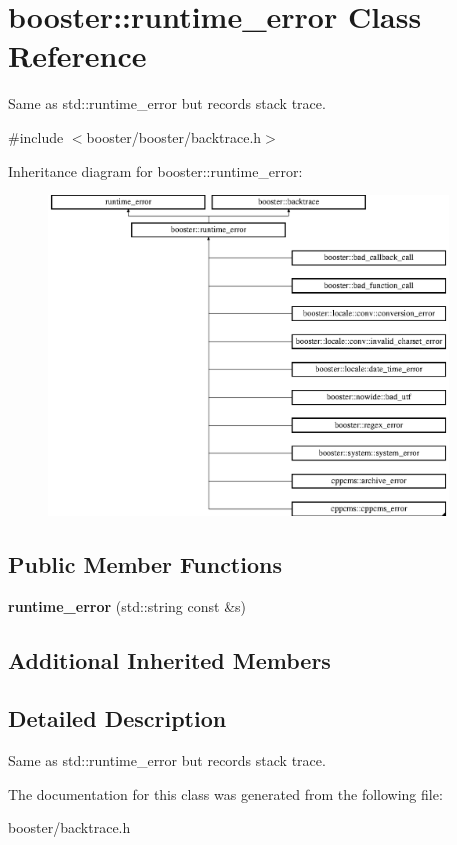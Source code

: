 \section{booster\+:\+:runtime\+\_\+error Class Reference}
\label{classbooster_1_1runtime__error}


Same as std\+::runtime\+\_\+error but records stack trace.  




{\ttfamily \#include $<$booster/booster/backtrace.\+h$>$}

Inheritance diagram for booster\+:\+:runtime\+\_\+error\+:\begin{figure}[H]
\begin{center}
\leavevmode
\includegraphics[height=8.484848cm]{classbooster_1_1runtime__error}
\end{center}
\end{figure}
\subsection*{Public Member Functions}
\begin{DoxyCompactItemize}
\item 
{\bfseries runtime\+\_\+error} (std\+::string const \&s)\label{classbooster_1_1runtime__error_a54020944fcbcc8d1a6592900da0d137d}

\end{DoxyCompactItemize}
\subsection*{Additional Inherited Members}


\subsection{Detailed Description}
Same as std\+::runtime\+\_\+error but records stack trace. 

The documentation for this class was generated from the following file\+:\begin{DoxyCompactItemize}
\item 
booster/backtrace.\+h\end{DoxyCompactItemize}
